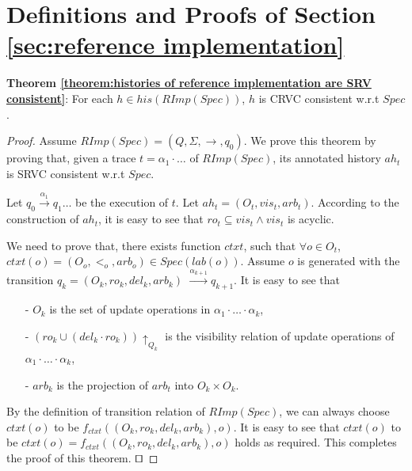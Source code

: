 
\section{Definitions and Proofs of Section \ref{sec:reference implementation}}
\label{sec:appendix definitions and proofs of section reference implementation}

{\noindent \bf Theorem \ref{theorem:histories of reference implementation are SRV consistent}}: For each $h \in \mathit{his}(\mathit{RImp}(\mathit{Spec}))$, $h$ is CRVC consistent w.r.t $\mathit{Spec}$. 

\begin {proof} 

Assume $\mathit{RImp}(\mathit{Spec}) = (Q,\Sigma,\rightarrow,q_0)$. We prove this theorem by proving that, given a trace $t = \alpha_1 \cdot \ldots$ of $\mathit{RImp}(\mathit{Spec})$, its annotated history $\mathit{ah}_t$ is SRVC consistent w.r.t $\mathit{Spec}$. 

Let $q_0 {\xrightarrow{\alpha_1}} q_1 \ldots$ be the execution of $t$. Let $\mathit{ah}_t = (O_t,\mathit{vis}_t,\mathit{arb}_t)$. According to the construction of $\mathit{ah}_t$, it is easy to see that $\mathit{ro}_t \subseteq \mathit{vis}_t \wedge \mathit{vis}_t$ is acyclic.

We need to prove that, there exists function $ctxt$, such that $\forall o \in O_t$, $ctxt(o) = (O_o,<_o,arb_o) \in Spec(lab(o))$. Assume $o$ is generated with the transition $q_k = (O_k,\mathit{ro}_k,\mathit{del}_k,\mathit{arb}_k)$ ${\xrightarrow{\alpha_{k+1}}} q_{k+1}$. It is easy to see that

\begin{itemize}
\setlength{\itemsep}{0.5pt}
\item[-] $O_k$ is the set of update operations in $\alpha_1 \cdot \ldots \cdot \alpha_k$,

\item[-] $(\mathit{ro}_k \cup (\mathit{del}_k \cdot \mathit{ro}_k)) \uparrow_{ Q_k }$ is the visibility relation of update operations of $\alpha_1 \cdot \ldots \cdot \alpha_k$,

\item[-] $\mathit{arb}_k$ is the projection of $arb_t$ into $O_k \times O_k$.
\end{itemize}

By the definition of transition relation of $\mathit{RImp}(\mathit{Spec})$, we can always choose $ctxt(o)$ to be $f_{\mathit{ctxt}}((O_k,\mathit{ro}_k,\mathit{del}_k,\mathit{arb}_k),o)$. It is easy to see that $ctxt(o)$ to be $ctxt(o) = f_{\mathit{ctxt}}((O_k,\mathit{ro}_k,\mathit{del}_k,\mathit{arb}_k),o)$ holds as required. This completes the proof of this theorem. $\qed$
\end {proof}





